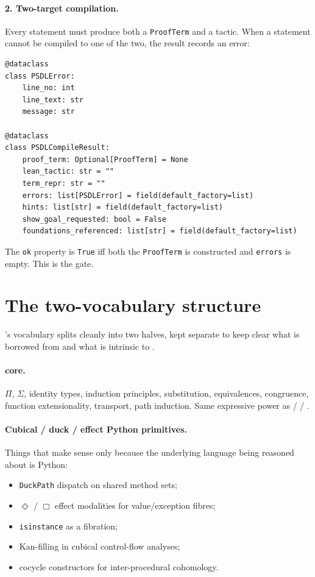 \paragraph{2. Two-target compilation.} Every statement must produce
both a \texttt{ProofTerm} and a \Lean{} tactic.  When a statement
cannot be compiled to one of the two, the result records an error:
\begin{lstlisting}
@dataclass
class PSDLError:
    line_no: int
    line_text: str
    message: str

@dataclass
class PSDLCompileResult:
    proof_term: Optional[ProofTerm] = None
    lean_tactic: str = ""
    term_repr: str = ""
    errors: list[PSDLError] = field(default_factory=list)
    hints: list[str] = field(default_factory=list)
    show_goal_requested: bool = False
    foundations_referenced: list[str] = field(default_factory=list)
\end{lstlisting}
The \texttt{ok} property is \texttt{True} iff both the
\texttt{ProofTerm} is constructed and \texttt{errors} is empty.
This is the gate.

\section{The two-vocabulary structure}
\label{sec:two-vocab}

\PSDL's vocabulary splits cleanly into two halves, kept separate
to keep clear what is borrowed from \CIC{} and what is intrinsic to
\Deppy.

\paragraph{\CIC{} core.}  $\Pi$, $\Sigma$, identity types, induction
principles, substitution, equivalences, congruence, function
extensionality, transport, path induction.  Same expressive power as
\Lean{} / \Coq{} / \Agda{}.

\paragraph{Cubical / duck / effect Python primitives.}  Things that
make sense only because the underlying language being reasoned about
is Python:
\begin{itemize}[leftmargin=1.7em]
  \item \texttt{DuckPath} dispatch on shared method sets;
  \item $\Diamond$ / $\Box$ effect modalities for value/exception
    fibres;
  \item \texttt{isinstance} as a fibration;
  \item Kan-filling in cubical control-flow analyses;
  \item cocycle constructors for inter-procedural cohomology.
\end{itemize}

